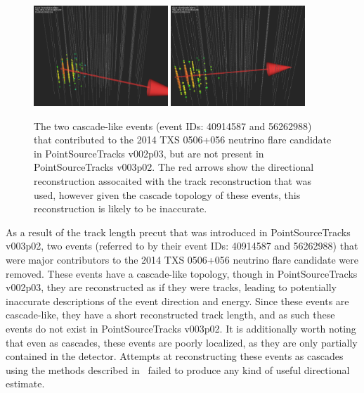 \begin{figure}[h]
\centering
\includegraphics[width=0.45\textwidth]{figs/125659.png}
\includegraphics[width=0.45\textwidth]{figs/125762.png}
\caption{The two cascade-like events (event IDs: 40914587 and 56262988) that contributed to the 2014 TXS 0506+056 neutrino flare candidate in PointSourceTracks v002p03, but are not present in PointSourceTracks v003p02. The red arrows show the directional reconstruction assocaited with the track reconstruction that was used, however given the cascade topology of these events, this reconstruction is likely to be inaccurate. }
\label{fig:missingevts}
\end{figure}

As a result of the track length precut that was introduced in PointSourceTracks v003p02, two events (referred to by their event IDs: 40914587 and 56262988) that were major contributors to the 2014 TXS 0506+056 neutrino flare candidate were removed. These events have a cascade-like topology, though in PointSourceTracks v002p03, they are reconstructed as if they were tracks, leading to potentially inaccurate descriptions of the event direction and energy. Since these events are cascade-like, they have a short reconstructed track length, and as such these events do not exist in PointSourceTracks v003p02. It is additionally worth noting that even as cascades, these events are poorly localized, as they are only partially contained in the detector. Attempts at reconstructing these events as cascades using the methods described in~\cite{cascade_dnn_paper} failed to produce any kind of useful directional estimate. 

